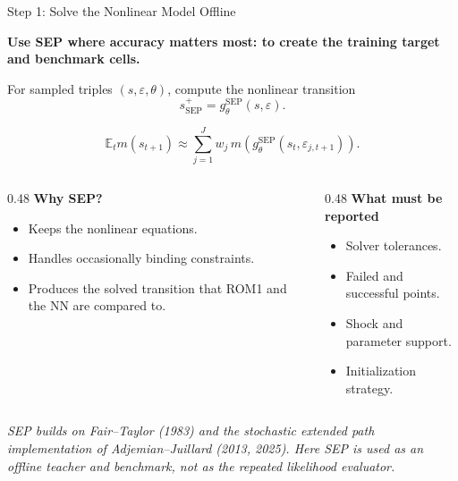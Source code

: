 \documentclass[aspectratio=169,10pt]{beamer}
\newcommand{\sep}{\mathrm{SEP}}
\newcommand{\E}{\mathbb{E}}
\newcommand{\eps}{\varepsilon}
\newcommand{\state}{s}
\newcommand{\sourcefoot}[1]{%
  \vspace{-0.55em}
  \begin{flushleft}
  \parbox{0.96\linewidth}{\raggedright\tiny\textit{#1}}
  \end{flushleft}
}
\newcommand{\claim}[1]{%
  \begin{center}
  \parbox{0.94\linewidth}{\centering\large\bfseries #1}
  \end{center}
}
\begin{document}
\begin{frame}{Step 1: Solve the Nonlinear Model Offline}
\claim{Use SEP where accuracy matters most: to create the training target and benchmark cells.}

\vspace{0.2em}
For sampled triples \((\state,\eps,\theta)\), compute the nonlinear transition
\[
  \state^+_{\sep} = g^{\sep}_{\theta}(\state,\eps).
\]

\vspace{-0.15em}
\[
  \E_t m(\state_{t+1})
  \approx
  \sum_{j=1}^{J} w_j\,
  m\!\left(g_\theta^{\sep}(\state_t,\eps_{j,t+1})\right).
\]

\vspace{-0.35em}
\begin{columns}[T,onlytextwidth]
\begin{column}{0.48\textwidth}
\textbf{Why SEP?}
\begin{itemize}
  \item Keeps the nonlinear equations.
  \item Handles occasionally binding constraints.
  \item Produces the solved transition that ROM1 and the NN are compared to.
\end{itemize}
\end{column}
\begin{column}{0.48\textwidth}
\textbf{What must be reported}
\begin{itemize}
  \item Solver tolerances.
  \item Failed and successful points.
  \item Shock and parameter support.
  \item Initialization strategy.
\end{itemize}
\end{column}
\end{columns}
\sourcefoot{SEP builds on Fair--Taylor (1983) and the stochastic extended path implementation of Adjemian--Juillard (2013, 2025). Here SEP is used as an offline teacher and benchmark, not as the repeated likelihood evaluator.}
\end{frame}
\end{document}
